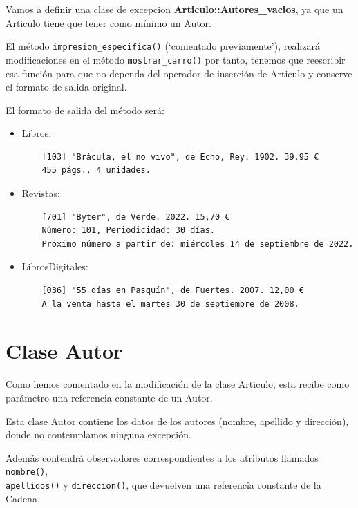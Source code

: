 Vamos a definir una clase de excepcion \textbf{Articulo::Autores\_vacios}, ya que un Articulo tiene que tener como mínimo un Autor.


El método \texttt{impresion\_especifica()} (`comentado previamente'), realizará modificaciones en el método \texttt{mostrar\_carro()} por tanto, tenemos que reescribir esa función para que no dependa del operador de inserción de Articulo y conserve el formato de salida original.

El formato de salida del método será:
\begin{itemize}
  \item Libros:
  \begin{center}
    \begin{verbatim}
    [103] "Brácula, el no vivo", de Echo, Rey. 1902. 39,95 €
    455 págs., 4 unidades.
    \end{verbatim}
  \end{center}
  \item Revistas:
  \begin{center}
    \begin{verbatim}
    [701] "Byter", de Verde. 2022. 15,70 €
    Número: 101, Periodicidad: 30 días.
    Próximo número a partir de: miércoles 14 de septiembre de 2022.
    \end{verbatim}
  \end{center}
  \item LibrosDigitales:
  \begin{center}
    \begin{verbatim}
    [036] "55 días en Pasquín", de Fuertes. 2007. 12,00 €
    A la venta hasta el martes 30 de septiembre de 2008.
    \end{verbatim}
  \end{center}
\end{itemize}

\section{Clase Autor}
Como hemos comentado en la modificación de la clase Articulo, esta recibe como parámetro una referencia constante de un Autor.

Esta clase Autor contiene los datos de los autores (nombre, apellido y dirección), donde no contemplamos ninguna excepción.

Además contendrá observadores correspondientes a los atributos llamados \texttt{nombre()},\\\texttt{apellidos()} y \texttt{direccion()}, que devuelven una referencia constante de la Cadena.
\newpage
